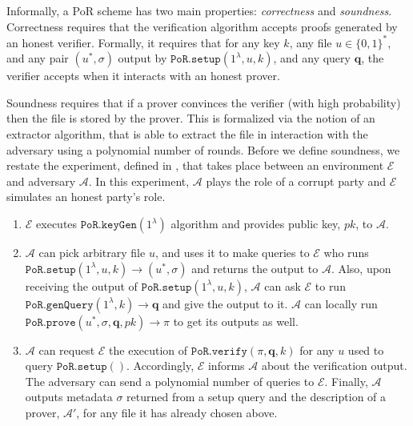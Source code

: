 Informally, a PoR scheme has two main properties: \emph{correctness} and \emph{soundness}. Correctness requires that the verification algorithm accepts  proofs generated by an honest verifier. Formally, it requires that for any key $k$, any file $u\in\{0,1\}^{\scriptscriptstyle *}$, and any  pair $(u^{*},\sigma)$ output by $\mathtt{PoR.setup}(1^{\scriptscriptstyle\lambda}, u,k)$, and any query $\bm{q}$, the verifier  accepts when it interacts with an honest prover.

 Soundness requires that if a prover convinces the verifier (with high probability) then the file is stored by the prover. This is formalized via the notion of an extractor algorithm, that is able to extract the file in interaction with the adversary using a polynomial number of  rounds. Before we define  soundness, we restate the  experiment, defined in \cite{DBLP:conf/asiacrypt/ShachamW08}, that takes place between an environment $\mathcal{E}$ and  adversary $\mathcal{A}$. In this experiment, $\mathcal{A}$ plays the role of a corrupt party and $\mathcal{E}$ simulates an honest party's role. 


\begin{enumerate}
\item $\mathcal{E}$ executes $\mathtt{PoR.keyGen}(1^{\scriptscriptstyle\lambda})$ algorithm and provides public key, $pk$, to $\mathcal{A}$.   
\item $\mathcal{A}$ can pick  arbitrary file $u$, and  uses it to make queries to  $\mathcal{E}$ who runs  $\mathtt{PoR.setup}(1^{\scriptscriptstyle\lambda}, u,k)\rightarrow (u^{\scriptscriptstyle *}, \sigma)$   and returns the output to $\mathcal{A}$. Also, upon receiving the output of $\mathtt{PoR.setup}(1^{\scriptscriptstyle\lambda}, u,k)$, $\mathcal{A}$ can ask $\mathcal{E}$  to run   $\mathtt{PoR.genQuery}(1^{\scriptscriptstyle\lambda},k)\rightarrow \bm{q}$ and give the output to it. $\mathcal{A}$ can locally run $\mathtt{PoR.prove}(u^{\scriptscriptstyle *}, \sigma, \bm{q},pk)\rightarrow \pi$ to get its outputs as well. 
\item $\mathcal{A}$ can request $\mathcal{E}$ the execution of $\mathtt{PoR.verify}(\pi,\bm{q},k)$ for any $u$ used to query $\mathtt{PoR.setup}()$. Accordingly, $\mathcal{E}$ informs  $\mathcal{A}$ about the verification output. The adversary can send a polynomial number of queries to $\mathcal{E}$. Finally, $\mathcal{A}$ outputs metadata $\sigma$ returned from a setup query and the description of a prover, $\mathcal{A}'$, for any file it has already chosen above. 
\end{enumerate}

